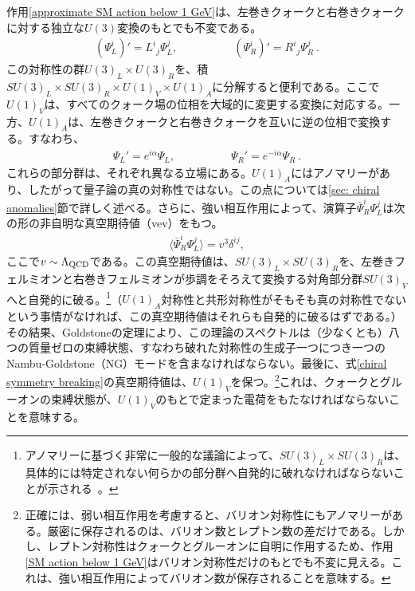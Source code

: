 作用\eqref{approximate SM action below 1 GeV}は、左巻きクォークと右巻きクォークに対する独立な$U(3)$変換のもとでも不変である。
%
\begin{align}
	(\Psi_L^i)' = L^i{}_j \Psi_L^j, \qquad \qquad \quad (\Psi_R^i)' = R^i{}_j \Psi_R^j \ .
\end{align}
%
この対称性の群$U(3)_L \times U(3)_R$を、積$SU(3)_L \times SU(3)_R \times U(1)_V \times U(1)_A$に分解すると便利である。ここで$U(1)_V$は、すべてのクォーク場の位相を大域的に変更する変換に対応する。一方、$U(1)_A$は、左巻きクォークと右巻きクォークを互いに逆の位相で変換する。すなわち、
%
\begin{align}
	\Psi_L' = e^{i \alpha} \Psi_L, \qquad \qquad \quad \Psi_R' = e^{-i \alpha} \Psi_R \ .
\end{align}
%
これらの部分群は、それぞれ異なる立場にある。$U(1)_A$にはアノマリーがあり、したがって量子論の真の対称性ではない。この点については\ref{sec: chiral anomalies}節で詳しく述べる。さらに、強い相互作用によって、演算子$\bar \Psi^i_R \Psi_L^j$は次の形の非自明な真空期待値（vev）をもつ。
%
\begin{align} \label{chiral symmetry breaking}
	\langle \bar \Psi^i_R \Psi_L^j \rangle = v^3 \delta^{ij} ,
\end{align}
%
ここで$v \sim \Lambda_{\rm QCD}$である。この真空期待値は、$SU(3)_L \times SU(3)_R$を、左巻きフェルミオンと右巻きフェルミオンが歩調をそろえて変換する対角部分群$SU(3)_V$へと自発的に破る。\footnote{アノマリーに基づく非常に一般的な議論によって、$SU(3)_L \times SU(3)_R$は、具体的には特定されない何らかの部分群へ自発的に破れなければならないことが示される~\cite{tHooft:1979bh}。}（$U(1)_A$対称性と共形対称性がそもそも真の対称性でないという事情がなければ、この真空期待値はそれらも自発的に破るはずである。）その結果、Goldstoneの定理により、この理論のスペクトルは（少なくとも）八つの質量ゼロの束縛状態、すなわち破れた対称性の生成子一つにつき一つのNambu-Goldstone（NG）モードを含まなければならない。最後に、式\eqref{chiral symmetry breaking}の真空期待値は、$U(1)_V$を保つ。\footnote{正確には、弱い相互作用を考慮すると、バリオン対称性にもアノマリーがある。厳密に保存されるのは、バリオン数とレプトン数の差だけである。しかし、レプトン対称性はクォークとグルーオンに自明に作用するため、作用\eqref{SM action below 1 GeV}はバリオン対称性だけのもとでも不変に見える。これは、強い相互作用によってバリオン数が保存されることを意味する。}これは、クォークとグルーオンの束縛状態が、$U(1)_V$のもとで定まった電荷をもたなければならないことを意味する。

